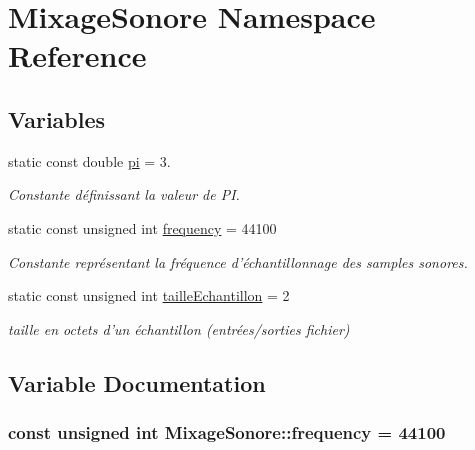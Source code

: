 \hypertarget{namespaceMixageSonore}{\section{Mixage\-Sonore Namespace Reference}
\label{namespaceMixageSonore}
}
\subsection*{Variables}
\begin{DoxyCompactItemize}
\item 
static const double \hyperlink{namespaceMixageSonore_a74eacef80ae62303d777e9b6791cd8af}{pi} = 3.
\begin{DoxyCompactList}\small\item\em Constante définissant la valeur de P\-I. \end{DoxyCompactList}\item 
static const unsigned int \hyperlink{namespaceMixageSonore_a9625ad51e0845108a6c3ef4ec340adc6}{frequency} = 44100
\begin{DoxyCompactList}\small\item\em Constante représentant la fréquence d'échantillonnage des samples sonores. \end{DoxyCompactList}\item 
static const unsigned int \hyperlink{namespaceMixageSonore_a1d6118bf5d0d09e5be4136d50f2ac887}{taille\-Echantillon} = 2
\begin{DoxyCompactList}\small\item\em taille en octets d'un échantillon (entrées/sorties fichier) \end{DoxyCompactList}\end{DoxyCompactItemize}


\subsection{Variable Documentation}
\hypertarget{namespaceMixageSonore_a9625ad51e0845108a6c3ef4ec340adc6}{
\subsubsection[{frequency}]{\setlength{\rightskip}{0pt plus 5cm}const unsigned int Mixage\-Sonore\-::frequency = 44100\hspace{0.3cm}{\ttfamily [static]}}}\label{namespaceMixageSonore_a9625ad51e0845108a6c3ef4ec340adc6}


